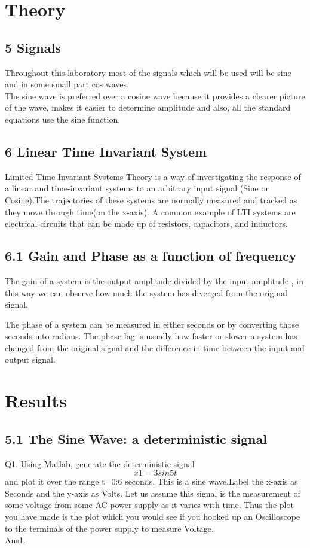 \documentclass{article}
\begin{document}
\section{Theory}\label{sec:theory}
\subsection{5 Signals}
Throughout this laboratory most of the signals which will be used will be sine and in some small part cos waves.\\ The sine wave is preferred over a cosine wave because it provides a clearer picture of the wave, makes it easier to determine amplitude and also, all the standard equations use the sine function. \\

\subsection{6 Linear Time Invariant System}
Limited Time Invariant Systems Theory is a way of investigating the response of a linear and time-invariant systems to an arbitrary input signal (Sine or Cosine).The trajectories of these systems are normally measured and tracked as they move through time(on the x-axis). A common example of LTI systems are electrical circuits that can be made up of resistors, capacitors, and inductors.\\


\subsection{6.1 Gain and Phase as a function of frequency}
The gain of a system is the output amplitude divided by the input amplitude , in this way we can observe how much the system has diverged from the original signal. 

The phase of a system can be measured in either seconds or by converting those seconds into radians. The phase lag is usually how faster or slower a system has changed from the original signal and the difference in time between the input and output signal. 

\pagebreak
\section{Results}\label{sec:result}
\subsection{5.1 The Sine Wave: a deterministic signal}
Q1. Using Matlab, generate the deterministic signal $$x1=3sin5t$$ and plot it over the range t=0:6 seconds. This is a sine wave.Label the x-axis as Seconds and the y-axis as Volts. Let us assume this signal is the measurement of some voltage from some AC power supply as it varies with time. Thus the plot you have made is the plot which you would see if you hooked up an Oscilloscope to the terminals of the power supply to measure Voltage.\\
Ans1.\\
\end{document}

